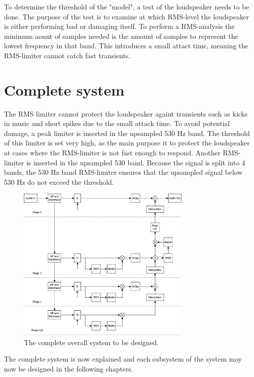 To determine the threshold of the "model", a test of the loudspeaker needs to be done. The purpose of the test is to examine at which RMS-level the loudspeaker is either performing bad or damaging itself. To perform a RMS-analysis the minimum aount of samples needed is the amount of samples to represent the lowest frequency in that band. This introduces a small attact time, meaning the RMS-limiter cannot catch fast transients.



\section{Complete system}

The RMS limiter cannot protect the loudspeaker againt transients such as kicks in music and short spikes due to the small attack time. To avoid potential damage, a peak limiter is inserted in the upsampled 530 Hz band. The threshold of this limiter is set very high, as the main purpose it to protect the loudspeaker at cases where the RMS-limiter is not fast enough to respond. Another RMS-limiter is inserted in the upsampled 530 band. Because the signal is split into 4 bands, the 530 Hz band RMS-limiter ensures that the upsampled signal below 530 Hz do not exceed the threshold.

\begin{figure}[H]
\centering
\includegraphics[width=0.75\textwidth]{figures/designRealFull.pdf}
\caption{The complete overall system to be designed.}
\label{fig:designRealBlock}
\end{figure}

The complete system is now explained and each subsystem of the system may now be designed in the following chapters.
